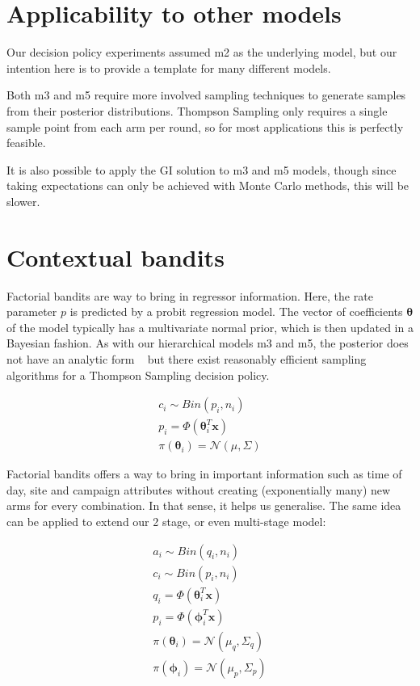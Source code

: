 \documentclass[11pt,a4,singlespacing,titlepagenumber=on]{scrreprt}
\numberwithin{equation}{chapter} %
\theoremstyle{remark}
\begin{document}
\section{Applicability to other models}

Our decision policy experiments assumed m2 as the underlying model, but our intention here is to provide a template for many different models. 

Both m3 and m5 require more involved sampling techniques to generate samples from their posterior distributions. Thompson Sampling only requires a single sample point from each arm per round, so for most applications this is perfectly feasible.

It is also possible to apply the GI solution to m3 and m5 models, though since taking expectations can only be achieved with Monte Carlo methods, this will be slower.

\section{Contextual bandits}

Factorial bandits are way to bring in regressor information. Here, the rate parameter $p$ is predicted by a probit regression model. The vector of coefficients $\mathbf{\theta}$ of the model typically has a multivariate normal prior, which is then updated in a Bayesian fashion. As with our hierarchical models m3 and m5, the posterior does not have an analytic form ~\cite{scott2010modern} but there exist reasonably efficient sampling algorithms for a Thompson Sampling decision policy.

\begin{align}
	c_i \sim Bin(p_i,n_i) \\
	p_i = \Phi(\mathbf{\theta}_i^T \mathbf{x}) \\
	\pi(\mathbf{\theta}_i) = \mathcal{N}(\mu,\Sigma)
\end{align}

Factorial bandits offers a way to bring in important information such as time of day, site and campaign attributes without creating (exponentially many) new arms for every combination. In that sense, it helps us generalise. The same idea can be applied to extend our 2 stage, or even multi-stage model:

\begin{align}
	a_i \sim Bin(q_i,n_i) \\
	c_i \sim Bin(p_i,n_i) \\
	q_i = \Phi(\mathbf{\theta}_i^T \mathbf{x}) \\
	p_i = \Phi(\mathbf{\phi}_i^T \mathbf{x}) \\
	\pi(\mathbf{\theta}_i) = \mathcal{N}(\mu_q,\Sigma_q) \\
	\pi(\mathbf{\phi}_i) = \mathcal{N}(\mu_p,\Sigma_p) 
\end{align}
\end{document}
